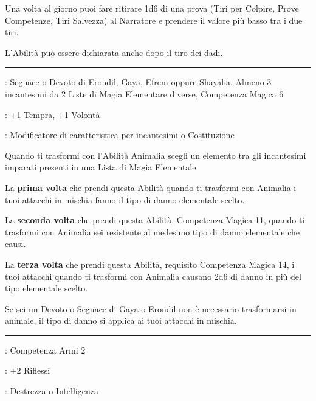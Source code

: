 \begin{multicols}{2}
Una volta al giorno puoi fare ritirare 1d6 di una prova (Tiri per Colpire, Prove Competenze, Tiri Salvezza) al Narratore e prendere il valore più basso tra i due tiri.

L'Abilità può essere dichiarata anche dopo il tiro dei dadi.

\smallskip\noindent\rule{\linewidth}{2pt} \hypertarget{Forma Elementale}{}\medskip{}
\noindent
\begin{description}[noitemsep, topsep=0pt, parsep=0pt, partopsep=0pt, leftmargin=0cm, labelwidth=2.5cm]
    \item[\textbf{Requisito}]: Seguace o Devoto di Erondil, Gaya, Efrem oppure Shayalia. Almeno 3 incantesimi da 2 Liste di Magia Elementare diverse, Competenza Magica 6
    \item[\textbf{Tiri Salvezza}]: +1 Tempra, +1 Volontà
    \item[\textbf{Caratteristica}]: Modificatore di caratteristica per incantesimi o Costituzione
\end{description}

Quando ti trasformi con l'Abilità Animalia scegli un elemento tra gli incantesimi imparati presenti in una Lista di Magia Elementale.

La \textbf{prima volta} che prendi questa Abilità quando ti trasformi con Animalia i tuoi attacchi in mischia fanno il tipo di danno elementale scelto.

La \textbf{seconda volta} che prendi questa Abilità, Competenza Magica 11, quando ti trasformi con Animalia sei resistente al medesimo tipo di danno elementale che causi.

La \textbf{terza volta} che prendi questa Abilità, requisito Competenza Magica 14, i tuoi attacchi quando ti trasformi con Animalia causano 2d6 di danno in più del tipo elementale scelto.

Se sei un Devoto o Seguace di Gaya o Erondil non è necessario trasformarsi in animale, il tipo di danno si applica ai tuoi attacchi in mischia.

\smallskip\noindent\rule{\linewidth}{2pt} \hypertarget{Freccia chiamata, freccia consegnata}{}\medskip{}
\noindent
\begin{description}[noitemsep, topsep=0pt, parsep=0pt, partopsep=0pt, leftmargin=0cm, labelwidth=2.5cm]
    \item[\textbf{Requisito}]: Competenza Armi 2
    \item[\textbf{Tiri Salvezza}]: +2 Riflessi
    \item[\textbf{Caratteristica}]: Destrezza o Intelligenza
\end{description}


\end{multicols}
